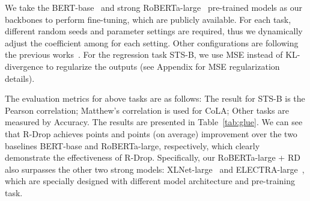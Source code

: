 \documentclass{article}
\begin{document}
We take the BERT-base~\cite{devlin2019bert} and strong RoBERTa-large~\cite{liu2019roberta} pre-trained models as our backbones to perform fine-tuning, which are publicly available.
For each task, different random seeds and parameter settings are required, thus we dynamically adjust the coefficient  among  for each setting.
Other configurations are following the previous works~\cite{devlin2019bert,liu2019roberta}.
For the regression task STS-B, we use MSE instead of KL-divergence to regularize the outputs (see Appendix for MSE regularization details).

The evaluation metrics for above  tasks are as follows: The result for STS-B is the Pearson correlation; Matthew’s correlation is used for CoLA; Other tasks are measured by Accuracy.
The results are presented in Table~\ref{tab:glue}.
We can see that R-Drop achieves  points and  points (on average) improvement over the two baselines BERT-base and RoBERTa-large, respectively, which clearly demonstrate the effectiveness of R-Drop. 
Specifically, our RoBERTa-large + RD also surpasses the other two strong models: XLNet-large~\cite{yang2019xlnet} and ELECTRA-large~\cite{clark2019electra}, which are specially designed with different model architecture and pre-training task.

\begin{table*}[ht]
\centering
\renewcommand\arraystretch{1.0}
\caption{
Fine-tuned model performances on GLUE language understanding benchmark.
}
\label{tab:glue}
\vspace{-0.3cm}
\end{table*}
\end{document}
